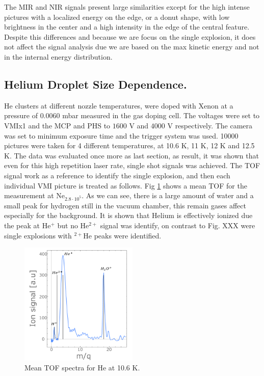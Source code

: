 The MIR and NIR signals present large similarities except for the high intense pictures with a localized energy on the edge, or a donut shape, with low brightness in the center and a high intensity in the edge of the central feature. Despite this differences and because we are focus on the single explosion, it does not affect the signal analysis due we are based on the max kinetic energy and not in the internal energy distribution.

\subsection{Helium Droplet Size Dependence.}

He clusters at different nozzle temperatures, were doped with Xenon at a pressure of $0.0060$ mbar measured in the gas doping cell. The voltages were set to VMIx1  and the MCP and PHS to $1600$ V and $4000$ V respectively. The camera was set to minimum exposure time and the trigger system was used. 10000 pictures were taken for 4 different temperatures, at 10.6 K, 11 K, 12 K and 12.5 K. The data was evaluated once more as last section, as result, it was shown that even for this high repetition laser rate, single shot signals was achieved. The TOF signal work as a reference to identify the single explosion, and then each individual VMI picture is treated as follows. Fig \ref{fig:tofhe} shows a mean TOF for the measurement at Ne$_{2.8\cdot10^{5}}$. As we can see, there is a large amount of water and a small peak for hydrogen still in the vacuum chamber, this remain gases affect especially for the background. It is shown that Helium is effectively ionized due the peak at He$^{+}$ but no He$^{2+}$ signal was identify, on contrast to Fig. XXX were single explosions with $^{2+}$He peaks were identified.

\begin{figure}[hbtp]
\centering
\includegraphics[width=0.5\textwidth]{../Images/results/Mir_He_Dropletsize/tof.png}
\caption[MIR TOF spectra He ]{Mean TOF spectra for He at 10.6 K. }
\label{fig:tofhe}
\end{figure}

